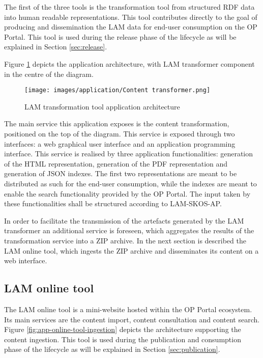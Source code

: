 	The first of the three tools is the transformation tool from structured RDF data into human readable representations. This tool contributes directly to the goal of producing and dissemination the LAM data for end-user consumption on the OP Portal. This tool is used during the release phase of the lifecycle as will be explained in Section \ref{sec:release}.	
	
	Figure \ref{fig:app-transformation-tool} depicts the application architecture, with LAM transformer component in the centre of the diagram.
	
    \begin{figure}[!h]
		\centering
		\texttt{[image: images/application/Content transformer.png]}
		\caption{LAM transformation tool application architecture}
		\label{fig:app-transformation-tool}
	\end{figure}

	The main service this application exposes is the content transformation, positioned on the top of the diagram. This service is exposed through two interfaces: a web graphical user interface and an application programming interface. This service is realised by three application functionalities: generation of the HTML representation, generation of the PDF representation and generation of JSON indexes. The first two representations are meant to be distributed as such for the end-user consumption, while the indexes are meant to enable the search functionality provided by the OP Portal. The input taken by these functionalities shall be structured according to LAM-SKOS-AP\cite{lam-skos-ap-2019}.
	
	In order to facilitate the transmission of the artefacts generated by the LAM transformer an additional service is foreseen, which aggregates the results of the transformation service into a ZIP archive. In the next section is described the LAM online tool, which ingests the ZIP archive and disseminates its content on a web interface. 
	
	\subsection{LAM online tool}
	
	The LAM online tool is a mini-website hosted within the OP Portal ecosystem. Its main services are the content import, content consultation and content search. Figure \ref{fig:app-online-tool-ingestion} depicts the architecture supporting the content ingestion. 
	This tool is used during the publication and consumption phase of the lifecycle as will be explained in Section \ref{sec:publication}.
		
